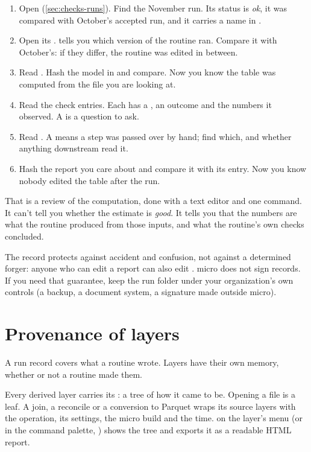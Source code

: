 \begin{enumerate}
\item Open  (\cref{sec:checks-runs}). Find the November run. Its status is \emph{ok}, it was compared with October's accepted run, and it carries a name in .
\item Open its .  tells you which version of the routine ran. Compare it with October's: if they differ, the routine was edited in between.
\item Read . Hash the model in  and compare. Now you know the table was computed from the file you are looking at.
\item Read the check entries. Each has a , an outcome and the numbers it observed. A  is a question to ask.
\item Read . A  means a step was passed over by hand; find which, and whether anything downstream read it.
\item Hash the report you care about and compare it with its  entry. Now you know nobody edited the table after the run.
\end{enumerate}

That is a review of the computation, done with a text editor and one command. It can't tell you whether the estimate is \emph{good}. It tells you that the numbers are what the routine produced from those inputs, and what the routine's own checks concluded.

\begin{caution}
The record protects against accident and confusion, not against a determined forger: anyone who can edit a report can also edit . micro does not sign records. If you need that guarantee, keep the run folder under your organization's own controls (a backup, a document system, a signature made outside micro).
\end{caution}

\section{Provenance of layers}\label{sec:records-lineage}
A run record covers what a routine wrote. Layers have their own memory, whether or not a routine made them.

Every derived layer carries its : a tree of how it came to be. Opening a file is a leaf. A join, a reconcile or a conversion to Parquet wraps its source layers with the operation, its settings, the micro build and the time.  on the layer's menu (or in the command palette, ) shows the tree and exports it as a readable HTML report.

